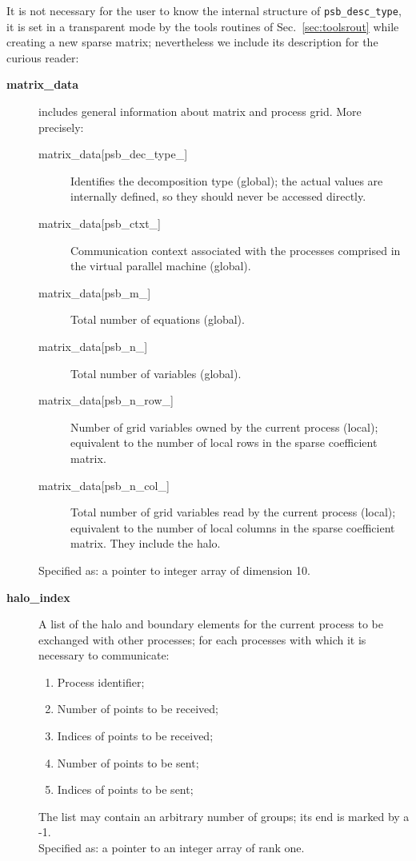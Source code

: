 It is not necessary for the user to know the internal structure of
\verb|psb_desc_type|, it is set in a transparent mode by the tools
routines of Sec.~\ref{sec:toolsrout} while creating a new sparse
matrix; nevertheless we include its description for the curious reader:  
\begin{description}
\item[{\bf matrix\_data}] includes general information about matrix and
process grid. More precisely:
\begin{description}
\item[matrix\_data[psb\_dec\_type\_\hbox{]}] Identifies the decomposition type
(global); the actual values are internally defined, so they should
never be accessed directly.
\item[matrix\_data[psb\_ctxt\_\hbox{]}] Communication context
  associated with the processes comprised in the virtual parallel
  machine (global).
\item[matrix\_data[psb\_m\_\hbox{]}] Total number of equations (global).
\item[matrix\_data[psb\_n\_\hbox{]}] Total number of variables (global).
\item[matrix\_data[psb\_n\_row\_\hbox{]}] Number of grid variables owned by the
current process (local); equivalent to the number of local rows in the
sparse coefficient matrix.
\item[matrix\_data[psb\_n\_col\_\hbox{]}] Total number of grid variables read by the
current process (local); equivalent to the number of local columns in
the sparse coefficient matrix. They include the halo.
\end{description}
Specified as: a pointer to integer array of dimension 10.
\item[{\bf halo\_index}] A list of the halo and boundary elements for
the current process to be exchanged with other processes; for each
processes with which it is necessary to communicate:
\begin{enumerate}
\item Process identifier;
\item Number of points to be received;
\item Indices of points to be received;
\item Number of points to be sent;
\item Indices of points to be sent;
\end{enumerate}
The list may contain an arbitrary number of groups; its end is marked
by a -1.\\
Specified as: a pointer to an integer array of rank one.

\end{description}
